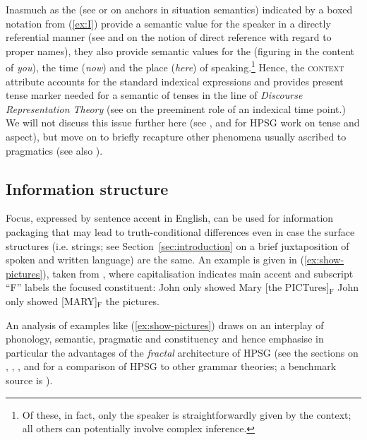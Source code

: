 \documentclass[output=paper]{langsci/langscibook}
\begin{document}
Inasmuch as the   (see \citet{Barwise:Perry:1983} or \citet{Devlin:1991} on anchors in situation semantics) indicated by a boxed notation from (\ref{ex:I}) provide a semantic value for the speaker in a directly referential  manner (see \citet{Marcus:1961} and \citet{Kripke:1980} on the notion of direct reference with regard to proper names), they also provide semantic values for the  (figuring in the content of \textit{you}), the time (\textit{now}) and the place (\textit{here}) of speaking.\footnote{Of these, in fact, only the speaker is straightforwardly given by the context; all others can potentially involve complex inference.}
%
Hence, the \textsc{context} attribute accounts for the standard indexical expressions and provides present tense marker needed for a semantic of tenses  in the line of \emph{Discourse Representation Theory}  \citep{Kamp:Reyle:1993} (see \citep{partee1973some} on the preeminent role of an indexical time point.)
%
We will not discuss this issue further here (see \citet{Van-Eynde:1998,Van-Eynde:2000}, \citet{Bonami:2002} and \citet{Costa:Branco:2012} for HPSG work on tense and aspect), but move on to briefly recapture other phenomena usually ascribed to pragmatics (see also \citet[Sec.~5.2]{Kathol:Przepiorkowski:Tseng:2011}).
 




  
\subsection{Information structure}
\label{sec:information-structure}

Focus, expressed by sentence accent in English, can be used for information packaging that may lead to truth-conditional differences  even in case the surface structures (i.e. strings; see Section~\ref{sec:introduction} on a brief juxtaposition of spoken and written language) are the same.
%
An example is given in (\ref{ex:show-pictures}), taken from \citet[p.~246]{Krifka:2008}, where capitalisation indicates main accent and subscript \enquote{F} labels the focused constituent:
%
\ea \label{ex:show-pictures}
  \ea John only showed Mary [the PICTures]$_\text{F}$
  \ex John only showed [MARY]$_\text{F}$ the pictures.
  \z
\z


An analysis of examples like (\ref{ex:show-pictures}) draws on an interplay of phonology, semantic, pragmatic and constituency and hence emphasise in particular the advantages of the \emph{fractal} \citep{Johnson:Lappin:1999} architecture   of HPSG (see the sections on , , ,  and  for a comparison of HPSG to other grammar theories; a benchmark source is \citealp{Mueller:2016}).
\end{document}
